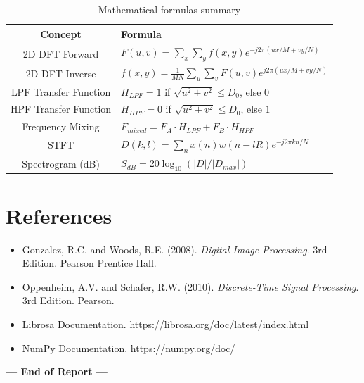 \documentclass[12pt,a4paper]{article}
\begin{document}
\bigskip
\begin{table}[H]
    \centering
    \begin{tabular}{|c|p{6cm}|}
        \hline
        \textbf{Concept} & \textbf{Formula} \\
        \hline
        2D DFT Forward & $F(u,v) = \sum_{x}\sum_{y} f(x,y) e^{-j2\pi(ux/M+vy/N)}$ \\
        \hline
        2D DFT Inverse & $f(x,y) = \frac{1}{MN}\sum_{u}\sum_{v} F(u,v) e^{j2\pi(ux/M+vy/N)}$ \\
        \hline
        LPF Transfer Function & $H_{LPF} = 1$ if $\sqrt{u^2+v^2} \leq D_0$, else $0$ \\
        \hline
        HPF Transfer Function & $H_{HPF} = 0$ if $\sqrt{u^2+v^2} \leq D_0$, else $1$ \\
        \hline
        Frequency Mixing & $F_{mixed} = F_A \cdot H_{LPF} + F_B \cdot H_{HPF}$ \\
        \hline
        STFT & $D(k,l) = \sum_n x(n)w(n-lR)e^{-j2\pi kn/N}$ \\
        \hline
        Spectrogram (dB) & $S_{dB} = 20\log_{10}(|D|/|D_{max}|)$ \\
        \hline
    \end{tabular}
    \caption{Mathematical formulas summary}
    \label{tab:formulas}
\end{table}

\bigskip
\section*{References}
\begin{itemize}
    \item Gonzalez, R.C. and Woods, R.E. (2008). \textit{Digital Image Processing}. 3rd Edition. Pearson Prentice Hall.
    \item Oppenheim, A.V. and Schafer, R.W. (2010). \textit{Discrete-Time Signal Processing}. 3rd Edition. Pearson.
    \item Librosa Documentation. \url{https://librosa.org/doc/latest/index.html}
    \item NumPy Documentation. \url{https://numpy.org/doc/}
\end{itemize}

\vfill
\begin{center}
\textbf{--- End of Report ---}
\end{center}
\end{document}
